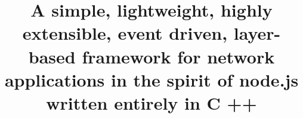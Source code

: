 ﻿\title[SNode.C]{\large A \alert{simple}, lightweight, highly extensible, event driven, layer-based framework for network applications in the spirit of \alert{node}.js written entirely in \alert{C }++}

\def\insertlecture{\Huge MQTTSuite\\\vspace{0.3cm}\Large The SNode.C Reference Project}


